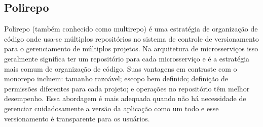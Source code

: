 
\subsection{Polirepo}
Polirepo (também conhecido como multirepo) é uma estratégia de organização de código onde usa-se múltiplos repositórios no sistema de controle de versionamento para o gerenciamento de múltiplos projetos. Na arquitetura de microsserviços isso geralmente significa ter um repositório para cada microsserviço e é a estratégia mais comum de organização de código. Suas vantagens em contraste com o monorepo incluem: tamanho razoável; escopo bem definido; definição de permissões diferentes para cada projeto; e operações no repositório têm melhor desempenho. Essa abordagem é mais adequada quando não há necessidade de gerenciar cuidadosamente a versão da aplicação como um todo e esse versionamento é transparente para os usuários. \cite{monorepo-polirepo-semaphoreci}




